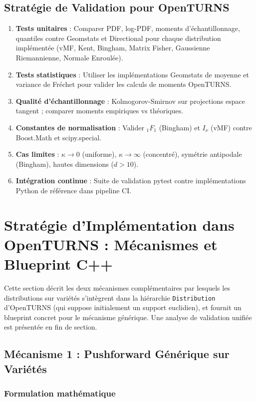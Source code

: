 \documentclass[11pt,a4paper]{article}
\begin{document}
\subsection{Stratégie de Validation pour OpenTURNS}
\begin{enumerate}
    \item \textbf{Tests unitaires} : Comparer PDF, log-PDF, moments d'échantillonnage, quantiles contre Geomstats et Directional pour chaque distribution implémentée (vMF, Kent, Bingham, Matrix Fisher, Gaussienne Riemannienne, Normale Enroulée).
    \item \textbf{Tests statistiques} : Utiliser les implémentations Geomstats de moyenne et variance de Fréchet pour valider les calculs de moments OpenTURNS.
    \item \textbf{Qualité d'échantillonnage} : Kolmogorov-Smirnov sur projections espace tangent ; comparer moments empiriques vs théoriques.
    \item \textbf{Constantes de normalisation} : Valider ${}_1F_1$ (Bingham) et $I_\nu$ (vMF) contre Boost.Math et scipy.special.
    \item \textbf{Cas limites} : $\kappa \to 0$ (uniforme), $\kappa \to \infty$ (concentré), symétrie antipodale (Bingham), hautes dimensions ($d > 10$).
    \item \textbf{Intégration continue} : Suite de validation pytest contre implémentations Python de référence dans pipeline CI.
\end{enumerate}

\section{Stratégie d'Implémentation dans OpenTURNS : Mécanismes et Blueprint C++}

Cette section décrit les deux mécanismes complémentaires par lesquels les distributions sur variétés s'intègrent dans la hiérarchie \texttt{Distribution} d'OpenTURNS (qui suppose initialement un support euclidien), et fournit un blueprint concret pour le mécanisme générique. Une analyse de validation unifiée est présentée en fin de section.

\subsection{Mécanisme 1 : Pushforward Générique sur Variétés}

\subsubsection{Formulation mathématique}
\end{document}
